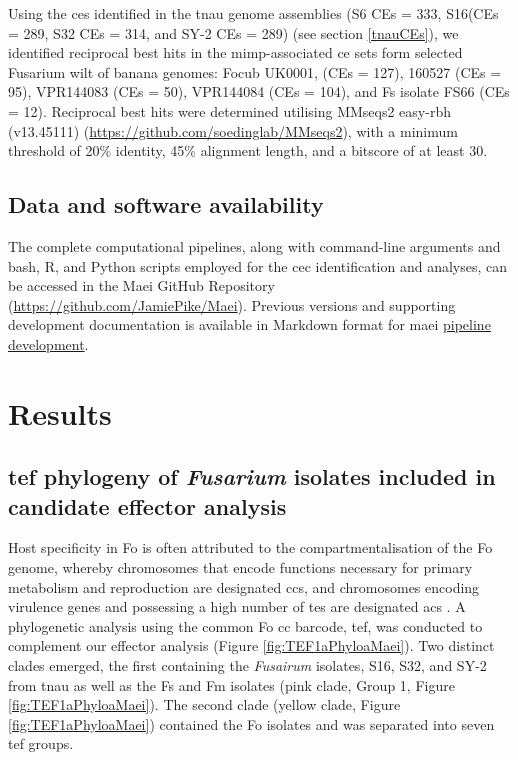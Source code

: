 Using the \acp{ce} identified in the  \ac{tnau} genome assemblies (S6 CEs = 333, S16(CEs = 289, S32 CEs = 314, and SY-2 CEs = 289) (see section \ref{tnauCEs}), we identified reciprocal best hits in the \ac{mimp}-associated \ac{ce} sets form selected \ac{Fusarium} wilt of banana genomes: \ac{Focub} UK0001, (CEs = 127), 160527 (CEs = 95), VPR144083 (CEs = 50), VPR144084 (CEs = 104), and \ac{Fs} isolate FS66 (CEs = 12).  Reciprocal best hits were determined utilising MMseqs2 easy-rbh (v13.45111) (\href{https://github.com/soedinglab/MMseqs2}{https://github.com/soedinglab/MMseqs2}),
with a minimum threshold of 20\% identity, 45\% alignment length, and a bitscore of at least 30.

\subsection{Data and software availability}

The complete computational pipelines, along with command-line arguments and bash, R, and Python scripts employed for the \ac{cec} identification and analyses, can be accessed in the Maei GitHub Repository (\href{https://github.com/JamiePike/Maei}{https://github.com/JamiePike/Maei}). Previous versions and supporting development documentation is available in Markdown format for \ac{maei} \href{https://github.com/JamiePike/Maei/tree/main/dev}{pipeline development}.

\newpage
\section{Results}

\subsection{\ac{tef} phylogeny of \textit{Fusarium} isolates included in candidate effector analysis}

Host specificity in \ac{Fo} is often attributed to the compartmentalisation of the \ac{Fo} genome, whereby chromosomes that  encode functions
necessary for primary metabolism and reproduction are designated \acfp{cc}, and chromosomes encoding virulence genes and possessing a high number of \acp{te} are designated \acfp{ac} \parencite{Ma2010, Dam2017}. A phylogenetic analysis using the common \ac{Fo} \ac{cc} barcode, \acf{tef}, was conducted to complement our effector analysis (Figure \ref{fig:TEF1aPhyloaMaei}). Two distinct clades emerged, the first containing the \textit{Fusairum} isolates, S16, S32, and SY-2 from \ac{tnau} as well as the \acl{Fs} and \acl{Fm} isolates (pink clade, Group 1, Figure \ref{fig:TEF1aPhyloaMaei}). The second clade (yellow clade, Figure \ref{fig:TEF1aPhyloaMaei}) contained the \ac{Fo} isolates and was separated into seven \ac{tef} groups.  

